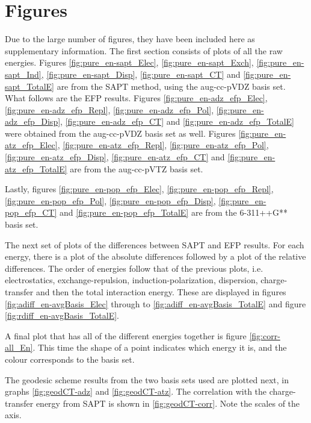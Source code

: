 
%
%


\section{Figures}
Due to the large number of figures, they have been included here as supplementary information. 
The first section consists of plots of all the raw energies. 
Figures 
\ref{fig:pure_en-sapt_Elec},
\ref{fig:pure_en-sapt_Exch},
\ref{fig:pure_en-sapt_Ind},
\ref{fig:pure_en-sapt_Disp},
\ref{fig:pure_en-sapt_CT} and
\ref{fig:pure_en-sapt_TotalE}
are from the SAPT method, using the aug-cc-pVDZ basis set. 
What follows are the EFP results. 
Figures
\ref{fig:pure_en-adz_efp_Elec},
\ref{fig:pure_en-adz_efp_Repl},
\ref{fig:pure_en-adz_efp_Pol},
\ref{fig:pure_en-adz_efp_Disp},
\ref{fig:pure_en-adz_efp_CT} and
\ref{fig:pure_en-adz_efp_TotalE}
were obtained from the aug-cc-pVDZ basis set as well.
Figures
\ref{fig:pure_en-atz_efp_Elec},
\ref{fig:pure_en-atz_efp_Repl},
\ref{fig:pure_en-atz_efp_Pol},
\ref{fig:pure_en-atz_efp_Disp},
\ref{fig:pure_en-atz_efp_CT} and
\ref{fig:pure_en-atz_efp_TotalE}
are from the aug-cc-pVTZ basis set.

Lastly, figures
\ref{fig:pure_en-pop_efp_Elec},
\ref{fig:pure_en-pop_efp_Repl},
\ref{fig:pure_en-pop_efp_Pol},
\ref{fig:pure_en-pop_efp_Disp},
\ref{fig:pure_en-pop_efp_CT} and
\ref{fig:pure_en-pop_efp_TotalE}
are from the 6-311++G** basis set.


The next set of plots of the differences between SAPT and EFP results.
For each energy, there is a plot of the absolute differences followed by a plot of the relative differences.
The order of energies follow that of the previous plots, i.e. electrostatics, exchange-repulsion, induction-polarization, dispersion, charge-transfer and then the total interaction energy.
These are displayed in figures
\ref{fig:adiff_en-avgBasis_Elec} through to
\ref{fig:adiff_en-avgBasis_TotalE} and figure
\ref{fig:rdiff_en-avgBasis_TotalE}.



A final plot that has all of the different energies together is figure
\ref{fig:corr-all_En}. 
This time the shape of a point indicates which energy it is, and the colour corresponds to the basis set.


The geodesic scheme results from the two basis sets used are plotted next, in graphs 
\ref{fig:geodCT-adz} and
\ref{fig:geodCT-atz}.
The correlation with the charge-transfer energy from SAPT is shown in 
\ref{fig:geodCT-corr}.
Note the scales of the axis.



